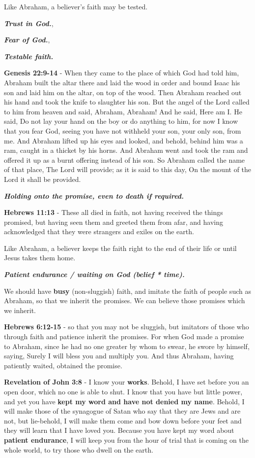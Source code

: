 \documentclass[11pt]{article}
\begin{document}
Like Abraham, a believer's faith may be tested.

\emph{\textbf{Trust in God.}},

\emph{\textbf{Fear of God.}},

\emph{\textbf{Testable faith.}}

\textbf{Genesis 22:9-14} - When they came to the place of which God had told him, Abraham built the altar there and laid the wood in order and bound Isaac his son and laid him on the altar, on top of the wood. Then Abraham reached out his hand and took the knife to slaughter his son. But the angel of the Lord called to him from heaven and said, Abraham, Abraham! And he said, Here am I. He said, Do not lay your hand on the boy or do anything to him, for now I know that you fear God, seeing you have not withheld your son, your only son, from me. And Abraham lifted up his eyes and looked, and behold, behind him was a ram, caught in a thicket by his horns. And Abraham went and took the ram and offered it up as a burnt offering instead of his son. So Abraham called the name of that place, The Lord will provide; as it is said to this day, On the mount of the Lord it shall be provided.

\emph{\textbf{Holding onto the promise, even to death if required.}}

\textbf{Hebrews 11:13} - These all died in faith, not having received the things promised, but having seen them and greeted them from afar, and having acknowledged that they were strangers and exiles on the earth.

Like Abraham, a believer keeps the faith right to the end of their life or until Jesus takes them home.

\emph{\textbf{Patient endurance / waiting on God (belief * time).}}

We should have \textbf{busy} (non-sluggish) faith,
and imitate the faith of people such as
Abraham, so that we inherit the promises.
We can believe those promises which we inherit.

\textbf{Hebrews 6:12-15} - so that you may not be sluggish, but imitators of those who through faith and patience inherit the promises. For when God made a promise to Abraham, since he had no one greater by whom to swear, he swore by himself, saying, Surely I will bless you and multiply you. And thus Abraham, having patiently waited, obtained the promise.

\textbf{Revelation of John 3:8} - I know your \textbf{works}. Behold, I have set before you an open door, which no one is able to shut. I know that you have but little power, and yet you have \textbf{kept my word and have not denied my name}. Behold, I will make those of the synagogue of Satan who say that they are Jews and are not, but lie-behold, I will make them come and bow down before your feet and they will learn that I have loved you. Because you have kept my word about \textbf{patient endurance}, I will keep you from the hour of trial that is coming on the whole world, to try those who dwell on the earth.
\end{document}
